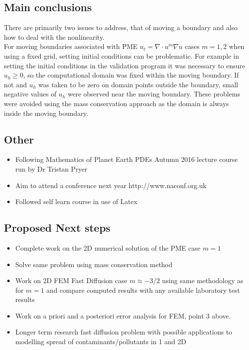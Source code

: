 \documentclass[11pt]{article}
\begin{document}
\subsection{Main conclusions}
There are primarily two issues to address, that of moving a boundary and also how to deal with the nonlinearity.\\
For moving boundaries associated with PME $ u_t = \nabla\cdot{u^m}\nabla{u} $ cases $ m =1, 2 $ when using a fixed grid, setting initial conditions can be problematic. For example in setting the initial conditions in the validation program it was necessary to ensure $ u_h \geq 0 $, so the computational domain was fixed within the moving boundary. If not and $u_h $ was taken to be zero on domain points outside the boundary, small negative values of $ u_h $ were observed near the moving boundary. These problems were avoided using the mass conservation approach as the domain is always inside the moving boundary. 
\subsection{Other}
\begin{itemize}
 \item Following Mathematics of Planet Earth PDEs Autumn 2016 lecture course run by Dr Tristan Pryer 
 \item Aim to attend a conference next year http://www.naconf.org.uk
 \item Followed self learn course in use of Latex
\end{itemize}
\subsection{Proposed Next steps}
\begin{itemize}
\item Complete work on the 2D numerical solution of the PME case $m = 1$
\item Solve same problem using mass conservation method
\item Work on 2D FEM Fast Diffusion case $m \approx -3/2$ using same methodology as for $m = 1$ and compare computed results with any available laboratory test results
\item Work on a priori and a posteriori error analysis for FEM, point 3 above. 
\item Longer term research fast diffusion problem with possible applications to modelling spread of contaminants/pollutants in 1 and 2D
\end{itemize}
\end{document}
